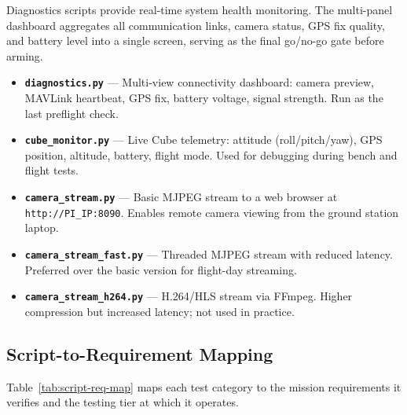 Diagnostics scripts provide real-time system health monitoring.  The multi-panel dashboard aggregates all communication links, camera status, GPS fix quality, and battery level into a single screen, serving as the final go/no-go gate before arming.

\begin{itemize}
    \item \textbf{\texttt{diagnostics.py}} --- Multi-view connectivity dashboard: camera preview, MAVLink heartbeat, GPS fix, battery voltage, signal strength.  Run as the last preflight check.
    \item \textbf{\texttt{cube\_monitor.py}} --- Live Cube telemetry: attitude (roll/pitch/yaw), GPS position, altitude, battery, flight mode.  Used for debugging during bench and flight tests.
    \item \textbf{\texttt{camera\_stream.py}} --- Basic MJPEG stream to a web browser at \texttt{http://PI\_IP:8090}.  Enables remote camera viewing from the ground station laptop.
    \item \textbf{\texttt{camera\_stream\_fast.py}} --- Threaded MJPEG stream with reduced latency.  Preferred over the basic version for flight-day streaming.
    \item \textbf{\texttt{camera\_stream\_h264.py}} --- H.264/HLS stream via FFmpeg.  Higher compression but increased latency; not used in practice.
\end{itemize}

\subsection{Script-to-Requirement Mapping}\label{sec:script-req-map}

Table~\ref{tab:script-req-map} maps each test category to the mission requirements it verifies and the testing tier at which it operates.

